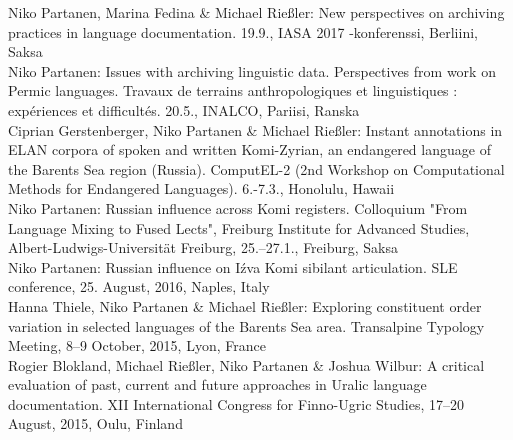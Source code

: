 \documentclass[11pt, a4paper]{article}
\newcommand{\years}[1]{\marginnote{\scriptsize #1}} %
\begin{document}
\years{2017}Niko Partanen, Marina Fedina \& Michael Rießler: New perspectives on archiving practices in language documentation. 19.9., IASA 2017 -konferenssi, Berliini, Saksa\\

\years{2017}Niko Partanen: Issues with archiving linguistic data. Perspectives from work on Permic languages. Travaux de terrains anthropologiques et linguistiques : expériences et difficultés. 20.5., INALCO, Pariisi, Ranska\\

\years{2017}Ciprian Gerstenberger, Niko Partanen \& Michael Rießler: Instant annotations in ELAN corpora of spoken and written Komi-Zyrian, an endangered language of the Barents Sea region (Russia). ComputEL-2 (2nd Workshop on Computational Methods for Endangered Languages). 6.-7.3., Honolulu, Hawaii\\


\years{2017} Niko Partanen: Russian influence across Komi registers. Colloquium "From Language Mixing to Fused Lects", Freiburg Institute for Advanced Studies, Albert-Ludwigs-Universität Freiburg, 25.--27.1., Freiburg, Saksa\\


\years{2016} Niko Partanen: Russian influence on Iźva Komi sibilant articulation. SLE conference, 25. August, 2016, Naples, Italy\\

\years{2015} Hanna Thiele, Niko Partanen \& Michael Rießler: Exploring constituent order variation in selected languages of the Barents Sea area. Transalpine Typology Meeting, 8–9 October, 2015, Lyon, France\\

\years{2015} Rogier Blokland, Michael Rießler, Niko Partanen \& Joshua Wilbur: A critical evaluation of past, current and future approaches in Uralic language documentation. XII International Congress for Finno-Ugric Studies, 17–20 August, 2015, Oulu, Finland\\
\end{document}
